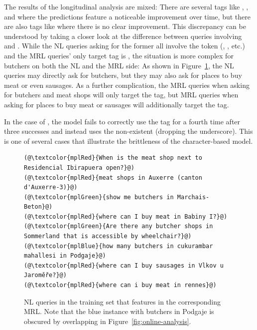 The results of the longitudinal analysis are mixed: There are several tags like
, ,  and
 where the predictions feature a noticeable improvement
over time, but there are also tags like  where there is no
clear improvement. This discrepancy can be understood by taking a closer look at
the difference between queries involving  and .
While the NL queries asking for the former all involve the token 
(, , etc.) and the MRL
queries’ only target tag is , the situation is more complex
for butchers on both the NL and the MRL side: As shown in
Figure~\ref{fig:butcher-nl}, the NL queries may directly ask for butchers, but
they may also ask for places to buy meat or even sausages. As a further
complication, the MRL queries when asking for butchers and meat shops will only
target the  tag, but MRL queries when asking for places to
buy meat or sausages will additionally target the  tag.

In the case of , the model fails to correctly use
the tag for a fourth time after three successes and instead uses the
non-existent   (dropping the underscore). This
is one of several cases that illustrate the brittleness of the character-based
model.

\begin{figure}[h]
  \centering
  \begin{lstlisting}[style=MyNL]
(@\textcolor{mplRed}{When is the meat shop next to Residencial Ibirapuera open?}@)
(@\textcolor{mplRed}{meat shops in Auxerre (canton d'Auxerre-3)}@)
(@\textcolor{mplGreen}{show me butchers in Marchais-Beton}@)
(@\textcolor{mplRed}{where can I buy meat in Babiny I?}@)
(@\textcolor{mplGreen}{Are there any butcher shops in Sommerland that is accessible by wheelchair?}@)
(@\textcolor{mplBlue}{how many butchers in cukurambar mahallesi in Podgaje}@)
(@\textcolor{mplRed}{where can I buy sausages in Vlkov u Jaroměře?}@)
(@\textcolor{mplRed}{where can i buy meat in rennes}@)
  \end{lstlisting}
  \caption[NL queries for butchers]{NL queries in the \nlmfour{} training set
    that features  in the corresponding MRL. Note that the
    blue instance with butchers in Podgaje is obscured by overlapping in
    Figure~\ref{fig:online-analysis}.}
  \label{fig:butcher-nl}
\end{figure}

